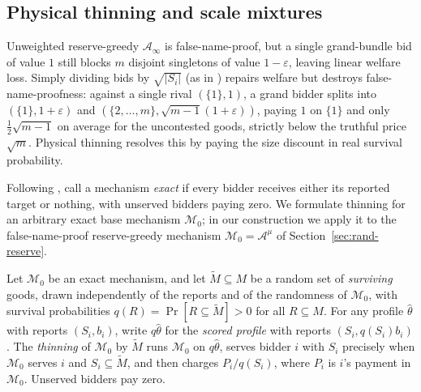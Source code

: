 \documentclass[format=acmsmall, review=false]{acmart}
\newcommand{\eps}{\varepsilon}
\theoremstyle{acmdefinition}%
\begin{document}
\subsection{Physical thinning and scale mixtures}
\label{sec:rand-thinning}

Unweighted reserve-greedy \(\mathcal A_\infty\) is
false-name-proof, but a single grand-bundle bid of value \(1\)
still blocks \(m\) disjoint singletons of value \(1-\eps\),
leaving linear welfare loss. Simply dividing bids by
\(\sqrt{|S_i|}\) (as in \citet{lehmann2002truth}) repairs welfare
but destroys false-name-proofness: against a single rival
\((\{1\},1)\), a grand bidder splits into \((\{1\},1+\eps)\) and
\((\{2,\ldots,m\},\sqrt{m-1}(1+\eps))\), paying \(1\) on \(\{1\}\)
and only \(\frac12\sqrt{m-1}\) on average for the uncontested
goods, strictly below the truthful price \(\sqrt m\). Physical
thinning resolves this by paying the size discount in real
survival probability.

Following \citet{lehmann2002truth}, call a mechanism \emph{exact}
if every bidder receives either its reported target or nothing,
with unserved bidders paying zero. We formulate thinning for an
arbitrary exact base mechanism \(\mathcal M_0\); in our
construction we apply it to the false-name-proof reserve-greedy
mechanism \(\mathcal M_0=\mathcal A^{\mu}\) of
Section~\ref{sec:rand-reserve}.

\begin{definition}
\label{def:thinning}
Let \(\mathcal M_0\) be an exact mechanism, and let
\(\widetilde M\subseteq M\) be a random set of \emph{surviving}
goods, drawn independently of the reports and of the randomness of
\(\mathcal M_0\), with survival probabilities
\(q(R)=\Pr[R\subseteq\widetilde M]>0\) for all \(R\subseteq M\).
For any profile \(\hat\theta\) with reports \((S_i,b_i)\), write
\(q\hat\theta\) for the \emph{scored profile} with reports
\((S_i,q(S_i)b_i)\). The \emph{thinning} of \(\mathcal M_0\) by
\(\widetilde M\) runs \(\mathcal M_0\) on \(q\hat\theta\), serves
bidder \(i\) with \(S_i\) precisely when \(\mathcal M_0\) serves
\(i\) and \(S_i\subseteq\widetilde M\), and then charges
\(P_i/q(S_i)\), where \(P_i\) is \(i\)'s payment in
\(\mathcal M_0\). Unserved bidders pay zero.
\end{definition}
\end{document}
